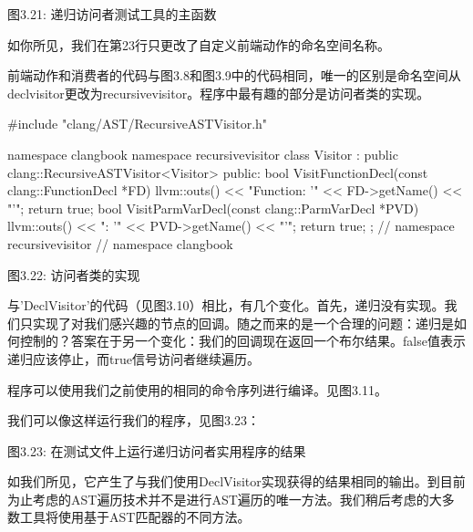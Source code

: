 \begin{center}
图3.21: 递归访问者测试工具的主函数
\end{center}

如你所见，我们在第23行只更改了自定义前端动作的命名空间名称。

前端动作和消费者的代码与图3.8和图3.9中的代码相同，唯一的区别是命名空间从declvisitor更改为recursivevisitor。程序中最有趣的部分是访问者类的实现。

\begin{cpp}
#include "clang/AST/RecursiveASTVisitor.h"

namespace clangbook {
namespace recursivevisitor {
class Visitor : public clang::RecursiveASTVisitor<Visitor> {
public:
  bool VisitFunctionDecl(const clang::FunctionDecl *FD) {
    llvm::outs() << "Function: '" << FD->getName() << "'\n";
    return true;
  }
  bool VisitParmVarDecl(const clang::ParmVarDecl *PVD) {
    llvm::outs() << "\tParameter: '" << PVD->getName() << "'\n";
    return true;
  }
};
} // namespace recursivevisitor
} // namespace clangbook
\end{cpp}

\begin{center}
图3.22: 访问者类的实现
\end{center}

与'DeclVisitor'的代码（见图3.10）相比，有几个变化。首先，递归没有实现。我们只实现了对我们感兴趣的节点的回调。随之而来的是一个合理的问题：递归是如何控制的？答案在于另一个变化：我们的回调现在返回一个布尔结果。false值表示递归应该停止，而true信号访问者继续遍历。

程序可以使用我们之前使用的相同的命令序列进行编译。见图3.11。

我们可以像这样运行我们的程序，见图3.23：


\begin{center}
图3.23: 在测试文件上运行递归访问者实用程序的结果
\end{center}

如我们所见，它产生了与我们使用DeclVisitor实现获得的结果相同的输出。到目前为止考虑的AST遍历技术并不是进行AST遍历的唯一方法。我们稍后考虑的大多数工具将使用基于AST匹配器的不同方法。



































